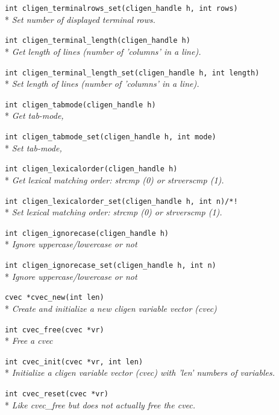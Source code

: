 \documentclass[a4paper, 10pt] {article}
\begin{document}
{\tt int  cligen\_terminalrows\_set(cligen\_handle h, int rows)}\\*
\emph{ Set number of displayed terminal rows.}

{\tt int cligen\_terminal\_length(cligen\_handle h)}\\*
\emph{ Get length of lines (number of 'columns' in a line).}

{\tt int  cligen\_terminal\_length\_set(cligen\_handle h, int length)}\\*
\emph{ Set length of lines (number of 'columns' in a line).}

{\tt int cligen\_tabmode(cligen\_handle h)}\\*
\emph{ Get tab-mode, }

{\tt int cligen\_tabmode\_set(cligen\_handle h, int mode)}\\*
\emph{ Set tab-mode, }

{\tt int cligen\_lexicalorder(cligen\_handle h)}\\*
\emph{ Get lexical matching order: strcmp (0) or strverscmp (1).}

{\tt int cligen\_lexicalorder\_set(cligen\_handle h, int n)/*! }\\*
\emph{ Set lexical matching order: strcmp (0) or strverscmp (1).}

{\tt int cligen\_ignorecase(cligen\_handle h)}\\*
\emph{ Ignore uppercase/lowercase or not}

{\tt int cligen\_ignorecase\_set(cligen\_handle h, int n)}\\*
\emph{ Ignore uppercase/lowercase or not}

{\tt cvec *cvec\_new(int len)}\\*
\emph{  Create and initialize a new cligen variable vector (cvec)}

{\tt int cvec\_free(cvec *vr)}\\*
\emph{ Free a cvec}

{\tt int cvec\_init(cvec *vr, int len)}\\*
\emph{ Initialize a cligen variable vector (cvec) with 'len' numbers of variables.}

{\tt int cvec\_reset(cvec *vr)}\\*
\emph{ Like cvec\_free but does not actually free the cvec.}
\end{document}
